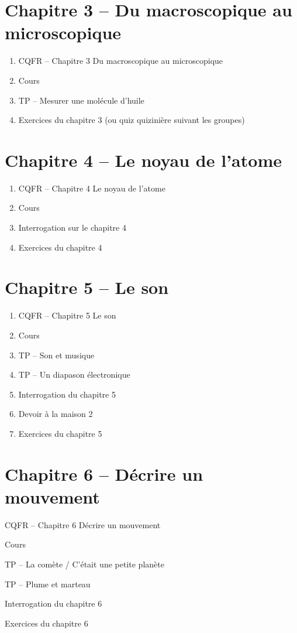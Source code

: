 \documentclass[12pt,a4paper]{article}
\begin{document}
\section*{Chapitre 3 -- Du macroscopique au microscopique}

\begin{enumerate}
\item CQFR -- Chapitre 3 Du macroscopique au microscopique
\item Cours
\item TP -- Mesurer une molécule d'huile
\item Exercices du chapitre 3 (ou quiz quizinière suivant les groupes)
\end{enumerate}

\section*{Chapitre 4 -- Le noyau de l'atome}

\begin{enumerate}
\item CQFR -- Chapitre 4 Le noyau de l'atome
\item Cours
\item Interrogation sur le chapitre 4
\item Exercices du chapitre 4
\end{enumerate}

\section*{Chapitre 5 -- Le son}

\begin{enumerate}
\item CQFR -- Chapitre 5 Le son
\item Cours
\item TP -- Son et musique
\item TP -- Un diapason électronique
\item Interrogation du chapitre 5
\item Devoir à la maison 2
\item Exercices du chapitre 5
\end{enumerate}

\section*{Chapitre 6 -- Décrire un mouvement}

\begin{enumerate}
\item CQFR -- Chapitre 6 Décrire un mouvement
\item Cours
\item TP -- La comète / C'était une petite planète
{\color{gray_c}\item TP -- Plume et marteau}
{\color{gray_c}\item Interrogation du chapitre 6}
\item Exercices du chapitre 6
\end{enumerate}
\end{document}

